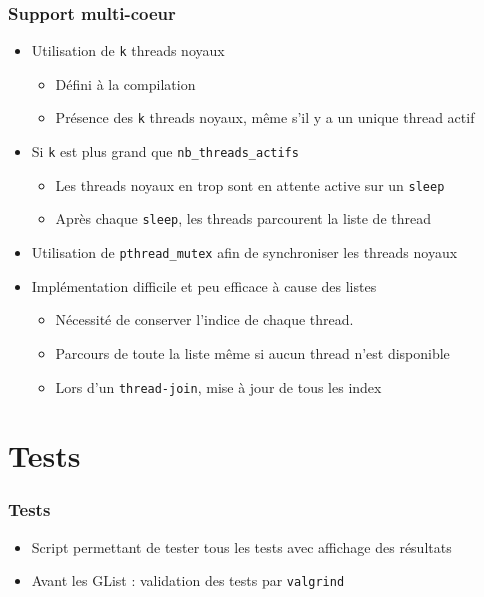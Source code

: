 \documentclass{beamer}
\begin{document}
\begin{frame}[containsverbatim]
  \frametitle{Support multi-coeur}
  \begin{itemize}
    \item Utilisation de \verb!k! threads noyaux
      \begin{itemize}
      \item Défini à la compilation
      \item Présence des \verb!k! threads noyaux, même s'il y a un unique
        thread actif
      \end{itemize}
    \item Si \verb!k! est plus grand que \verb!nb_threads_actifs!
      \begin{itemize}
        \item Les threads noyaux en trop sont en attente active sur un
          \verb!sleep!
        \item Après chaque \verb!sleep!, les threads parcourent la liste de
          thread
      \end{itemize}
    \item Utilisation de \verb!pthread_mutex! afin de synchroniser les
      threads noyaux
    \item Implémentation difficile et peu efficace à cause des listes
      \begin{itemize}
      \item Nécessité de conserver l'indice de chaque thread.
      \item Parcours de toute la liste même si aucun thread n'est disponible
      \item Lors d'un \verb!thread-join!, mise à jour de tous les index
      \end{itemize}
  \end{itemize}
\end{frame}

\section{Tests}

\begin{frame}[containsverbatim]
  \frametitle{Tests}
  \begin{itemize}
    \item Script permettant de tester tous les tests avec affichage des
      résultats
    \item Avant les GList : validation des tests par \verb!valgrind!
  \end{itemize}
\end{frame}
\end{document}
